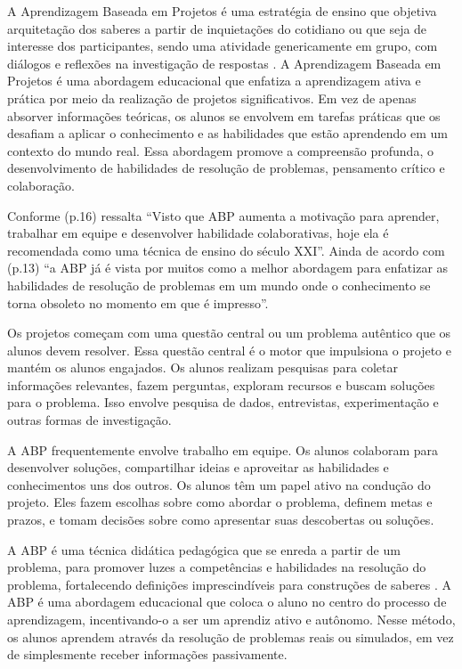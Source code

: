 A Aprendizagem Baseada em Projetos é uma estratégia de ensino que objetiva arquitetação dos saberes a partir de inquietações do cotidiano ou que seja de interesse dos participantes, sendo uma atividade genericamente em grupo, com diálogos e reflexões na investigação de respostas \cite{BENDER2015}. A Aprendizagem Baseada em Projetos é uma abordagem educacional que enfatiza a aprendizagem ativa e prática por meio da realização de projetos significativos. Em vez de apenas absorver informações teóricas, os alunos se envolvem em tarefas práticas que os desafiam a aplicar o conhecimento e as habilidades que estão aprendendo em um contexto do mundo real. Essa abordagem promove a compreensão profunda, o desenvolvimento de habilidades de resolução de problemas, pensamento crítico e colaboração.

Conforme  (p.16) ressalta ``Visto que ABP aumenta a motivação para aprender, trabalhar em equipe e desenvolver habilidade colaborativas, hoje ela é recomendada como uma técnica de ensino do século XXI''. Ainda de acordo com  (p.13) ``a ABP já é vista por muitos como a melhor abordagem para enfatizar as habilidades de resolução de problemas em um mundo onde o conhecimento se torna obsoleto no momento em que é impresso''.

Os projetos começam com uma questão central ou um problema autêntico que os alunos devem resolver. Essa questão central é o motor que impulsiona o projeto e mantém os alunos engajados. Os alunos realizam pesquisas para coletar informações relevantes, fazem perguntas, exploram recursos e buscam soluções para o problema. Isso envolve pesquisa de dados, entrevistas, experimentação e outras formas de investigação.

A ABP frequentemente envolve trabalho em equipe. Os alunos colaboram para desenvolver soluções, compartilhar ideias e aproveitar as habilidades e conhecimentos uns dos outros. Os alunos têm um papel ativo na condução do projeto. Eles fazem escolhas sobre como abordar o problema, definem metas e prazos, e tomam decisões sobre como apresentar suas descobertas ou soluções.

A ABP é uma técnica didática pedagógica que se enreda a partir de um problema, para promover luzes a competências e habilidades na resolução do problema, fortalecendo definições imprescindíveis para construções de saberes \cite{SILVA-LINS-LEAO2019}. A ABP é uma abordagem educacional que coloca o aluno no centro do processo de aprendizagem, incentivando-o a ser um aprendiz ativo e autônomo. Nesse método, os alunos aprendem através da resolução de problemas reais ou simulados, em vez de simplesmente receber informações passivamente.

